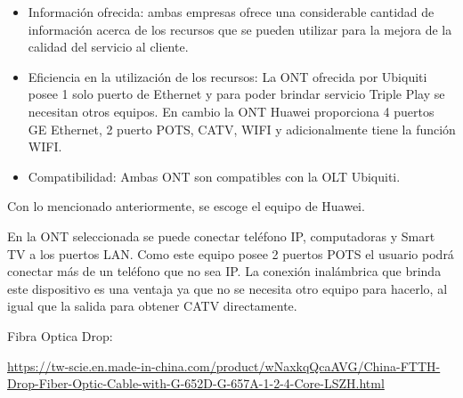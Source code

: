 \begin{enumerate}
\begin{enumerate}
\begin{itemize}
\item Información ofrecida: ambas empresas ofrece una considerable cantidad de información acerca de los recursos que se pueden utilizar para la mejora de la calidad del servicio al cliente.
\item Eficiencia en la utilización de los recursos: La ONT ofrecida por Ubiquiti posee 1 solo puerto de Ethernet y para poder brindar servicio Triple Play se necesitan otros equipos. En cambio la ONT Huawei proporciona 4 puertos GE Ethernet, 2 puerto POTS, CATV, WIFI y adicionalmente tiene la función WIFI. 
\item Compatibilidad: Ambas ONT son compatibles con la OLT Ubiquiti.
\end{itemize}
Con lo mencionado anteriormente, se escoge el equipo de Huawei.

En la ONT seleccionada se puede conectar teléfono IP, computadoras y Smart TV a los puertos LAN. Como este equipo posee 2 puertos POTS el usuario podrá conectar más de un teléfono que no sea IP. La conexión inalámbrica que brinda este dispositivo es una ventaja ya que no se necesita otro equipo para hacerlo, al igual que la salida para obtener CATV directamente. 




\end{enumerate}

\end{enumerate}


\begin{thebibliography}{99}





 Fibra Optica Drop: \begin{tiny}
\url{https://tw-scie.en.made-in-china.com/product/wNaxkqQcaAVG/China-FTTH-Drop-Fiber-Optic-Cable-with-G-652D-G-657A-1-2-4-Core-LSZH.html}
\end{tiny}








\end{thebibliography}



\newpage

